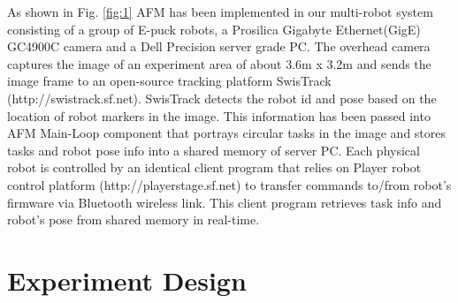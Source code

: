 \documentclass{llncs}
\begin{document}
As shown in Fig. \ref{fig:1} AFM has been implemented in our multi-robot system consisting of a group of E-puck robots, a Prosilica Gigabyte Ethernet(GigE) GC4900C camera and a Dell Precision server grade PC. The overhead camera captures the image of an experiment area of about 3.6m x 3.2m and sends the image frame to an open-source tracking platform SwisTrack (http://swistrack.sf.net). SwisTrack detects the robot id and pose based on the location of robot markers in the image. This information has been passed into AFM Main-Loop component that portrays circular tasks in the image and stores tasks and robot pose info into a shared memory of server PC. Each physical robot is controlled by an identical client program that relies on Player robot control platform (http://playerstage.sf.net) to transfer commands to/from robot's firmware via Bluetooth wireless link. This client program retrieves task info and robot's pose from shared memory in real-time.

% 
\section{Experiment Design}
\label{sec:expt-design}
\end{document}
